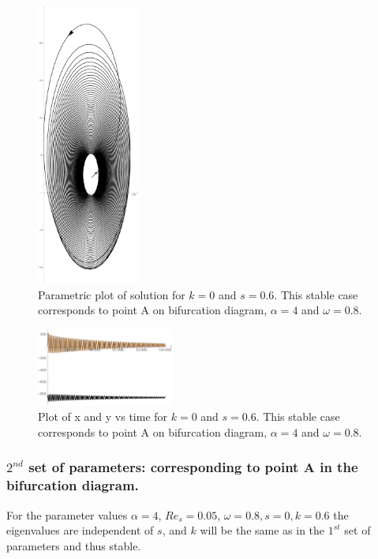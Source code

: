 \documentclass[pdflatex,sn-mathphys]{sn-jnl}%
\theoremstyle{thmstyleone}%
\theoremstyle{thmstyletwo}%
\theoremstyle{thmstylethree}%
\begin{document}
\begin{figure}[h]%
\centering
\includegraphics[width=0.3\textwidth]{Fig2left(stable)Parametric}
    \caption{Parametric plot of solution for  $k=0$ and $ s=0.6$. This stable case corresponds to point A on bifurcation diagram, $\alpha = 4$ and  $\omega = 0.8$.}
    \label{fig:Stable parametric corresponding to point A on bifurcation diagram}
\end{figure}
\begin{figure}[h]%
\centering
 \includegraphics[width=0.4\textwidth]{Fig2left(stablePlot}
    \caption{Plot of x and y vs time for $k = 0$ and $s = 0.6$. This stable case corresponds to point A on bifurcation diagram, $\alpha = 4$ and  $\omega = 0.8$.}
    \label{fig:Stable case corresponding to point A on bifurcation diagram}
\end{figure}

\subsubsection{$2^{nd}$ set of parameters: corresponding to point A in the bifurcation diagram.} \label{$2{nd}$ set}

For the parameter values $\alpha = 4$, $Re_{s}=0.05$, $\omega=0.8,s=0,k=0.6$
the eigenvalues are independent of $s$, and $k$  will be the same as in the $1^{st}$ set of parameters and thus stable.
\end{document}
